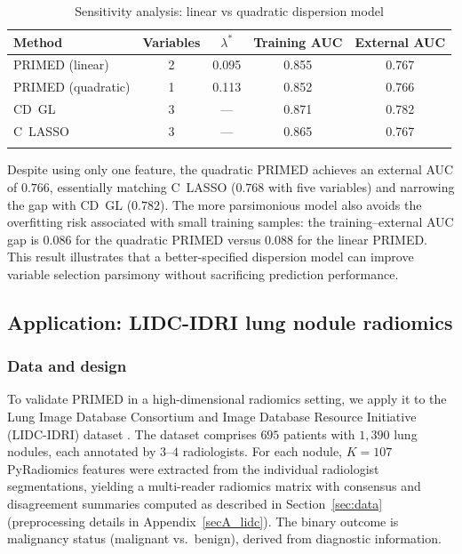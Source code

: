 \documentclass[referee,lineno,pdflatex,sn-vancouver-num]{sn-jnl}
\begin{document}
\begin{table}[h]
\caption{Sensitivity analysis: linear vs quadratic dispersion model}\label{tab:quad_comparison}
\small
\renewcommand{\arraystretch}{1.1}
\begin{tabular*}{\textwidth}{@{\extracolsep\fill}lcccc}
\toprule
Method & Variables & $\lambda^*$ & Training AUC & External AUC \\
\midrule
PRIMED (linear)    & 2 & 0.095 & 0.855 & 0.767 \\
PRIMED (quadratic) & 1 & 0.113 & 0.852 & 0.766 \\
CD~GL              & 3 & ---   & 0.871 & 0.782 \\
C~LASSO            & 3 & ---   & 0.865 & 0.767 \\
\botrule
\end{tabular*}
\end{table}

Despite using only one feature, the quadratic PRIMED achieves an external AUC of $0.766$, essentially matching C~LASSO ($0.768$ with five variables) and narrowing the gap with CD~GL ($0.782$).
The more parsimonious model also avoids the overfitting risk associated with small training samples: the training--external AUC gap is $0.086$ for the quadratic PRIMED versus $0.088$ for the linear PRIMED.
This result illustrates that a better-specified dispersion model can improve variable selection parsimony without sacrificing prediction performance.

\subsection{Application: LIDC-IDRI lung nodule radiomics}\label{sec:lidc}

\subsubsection{Data and design}

To validate PRIMED in a high-dimensional radiomics setting, we apply it to the Lung Image Database Consortium and Image Database Resource Initiative (LIDC-IDRI) dataset \cite{Armato2011}.
The dataset comprises $695$ patients with $1{,}390$ lung nodules, each annotated by $3$--$4$ radiologists.
For each nodule, $K = 107$ PyRadiomics features \cite{vanGriethuysen2017} were extracted from the individual radiologist segmentations, yielding a multi-reader radiomics matrix with consensus and disagreement summaries computed as described in Section~\ref{sec:data} (preprocessing details in Appendix~\ref{secA_lidc}).
The binary outcome is malignancy status (malignant vs.\ benign), derived from diagnostic information.
\end{document}
